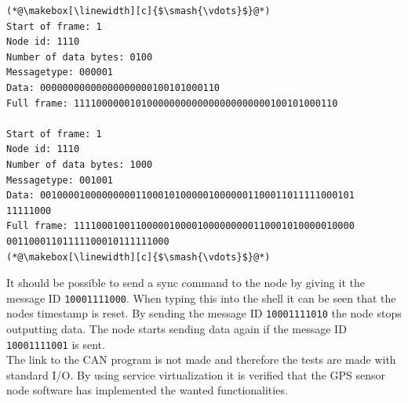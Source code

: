 \begin{lstlisting}[caption=Struct for data packet.,label=code:output_node]
(*@\makebox[\linewidth][c]{$\smash{\vdots}$}@*)
Start of frame: 1
Node id: 1110
Number of data bytes: 0100
Messagetype: 000001
Data: 00000000000000000000100101000110
Full frame: 11110000001010000000000000000000000100101000110

Start of frame: 1
Node id: 1110
Number of data bytes: 1000
Messagetype: 001001
Data: 00100001000000000110001010000010000001100011011111000101 11111000
Full frame: 11110001001100000100001000000000110001010000010000 00110001101111100010111111000
(*@\makebox[\linewidth][c]{$\smash{\vdots}$}@*)
\end{lstlisting}

It should be possible to send a sync command to the node by giving it the message ID \texttt{10001111000}.
When typing this into the shell it can be seen that the nodes timestamp is reset.
By sending the message ID \texttt{10001111010} the node stops outputting data.
The node starts sending data again if the message ID \texttt{10001111001} is sent.\\

The link to the CAN program is not made and therefore the tests are made with standard I/O.
By using service virtualization it is verified that the GPS sensor node software has implemented the wanted functionalities.
